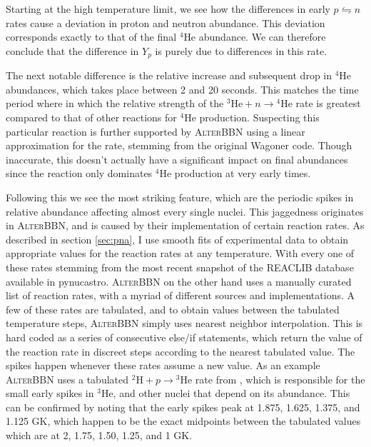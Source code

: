 Starting at the high temperature limit, we see how the differences in early $p\leftrightharpoons n$ rates cause a deviation in proton and neutron abundance. This deviation corresponds exactly to that of the final ${}^4$He abundance. We can therefore conclude that the difference in $Y_p$ is purely due to differences in this rate. 

The next notable difference is the relative increase and subsequent drop in ${}^4\text{He}$ abundances, which takes place between 2 and 20 seconds. This matches the time period where in which the relative strength of the ${}^3\text{He}+n\rightarrow {}^4\text{He}$ rate is greatest compared to that of other reactions for ${}^4$He production. Suspecting this particular reaction is further supported by \textsc{AlterBBN} using a linear approximation for the rate, stemming from the original Wagoner code\cite{Wagoner69}. Though inaccurate, this doesn't actually have a significant impact on final abundances since the reaction only dominates ${}^4\text{He}$ production at very early times. 

Following this we see the most striking feature, which are the periodic spikes in relative abundance affecting almost every single nuclei. This jaggedness originates in \textsc{AlterBBN}, and is caused by their implementation of certain reaction rates. As described in section \ref{sec:pna}, I use smooth fits of experimental data to obtain appropriate values for the reaction rates at any temperature. With every one of these rates stemming from the most recent snapshot of the REACLIB database\cite{REACLIB} available in pynucastro\cite{pynucastro2}. \textsc{AlterBBN} on the other hand uses a manually curated list of reaction rates, with a myriad of different sources and implementations. A few of these rates are tabulated, and to obtain values between the tabulated temperature steps, \textsc{AlterBBN} simply uses nearest neighbor interpolation. This is hard coded as a series of consecutive else/if statements, which return the value of the reaction rate in discreet steps according to the nearest tabulated value. The spikes happen whenever these rates assume a new value. As an example \textsc{AlterBBN} uses a tabulated ${}^2\text{H}+p\rightarrow {}^3\text{He}$ rate from \textcite{Coc_et_al_2015}, which is responsible for the small early spikes in ${}^3\text{He}$, and other nuclei that depend on its abundance. This can be confirmed by noting that the early spikes peak at 1.875, 1.625, 1.375, and 1.125 GK, which happen to be the exact midpoints between the tabulated values which are at 2, 1.75, 1.50, 1.25, and 1 GK. 


